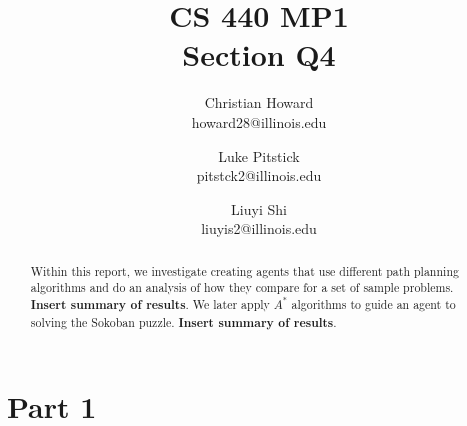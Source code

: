 \documentclass{article}[12pt]
\title{CS 440 MP1 \\ Section Q4}
\author{
Christian Howard \\ howard28@illinois.edu
\and
Luke Pitstick \\ pitstck2@illinois.edu
\and
Liuyi Shi \\ liuyis2@illinois.edu
}
\date{} %
\begin{document}
   
   \maketitle
   \begin{abstract}
   Within this report, we investigate creating agents that use different path planning algorithms and do an analysis of how they compare for a set of sample problems. \textbf{Insert summary of results}. We later apply $A^*$ algorithms to guide an agent to solving the  Sokoban puzzle. \textbf{Insert summary of results}.
   \end{abstract}
   \newpage
   
   \tableofcontents
   \newpage
   
   \section{Part 1}
   
   
\end{document}
